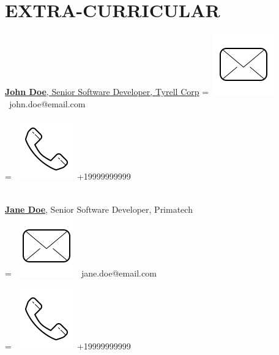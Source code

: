 \documentclass[]{CV}
\begin{document}
\begin{minipage}[t]{0.25\textwidth}
\section{EXTRA-CURRICULAR} 
\href{https://www.linkedin.com/company/john-doe/}{\textbf{John Doe}, Senior Software Developer, Tyrell Corp}
\begingroup
{}=\hbox{
\includegraphics[scale=0.1,trim={0 1cm 0cm 0cm}]{icons/main/mail.png}\hspace{0.3cm} john.doe@email.com
}
\parbox{\wd0}{}
\endgroup
\begingroup
{}=\hbox{
\includegraphics[scale=0.1,trim={0 1.25cm -0.4cm 0cm}]{icons/main/phone.png}\hspace{0.3cm}+19999999999
}
\parbox{\wd0}{}\endgroup
\\
\sectionsep
\href{https://www.linkedin.com/company/john-doe/}{\textbf{Jane Doe}}, Senior Software Developer, Primatech 
\\
\begingroup
{}=\hbox{
\includegraphics[scale=0.1,trim={0 1cm 0cm 0cm}]{icons/main/mail.png}\hspace{0.3cm} jane.doe@email.com
}
\parbox{\wd0}{}
\endgroup
\begingroup
{}=\hbox{
\includegraphics[scale=0.1,trim={0 1.25cm -0.4cm 0cm}]{icons/main/phone.png}\hspace{0.3cm}+19999999999
}
\parbox{\wd0}{}\endgroup
\\

\end{minipage} 
\end{document}

